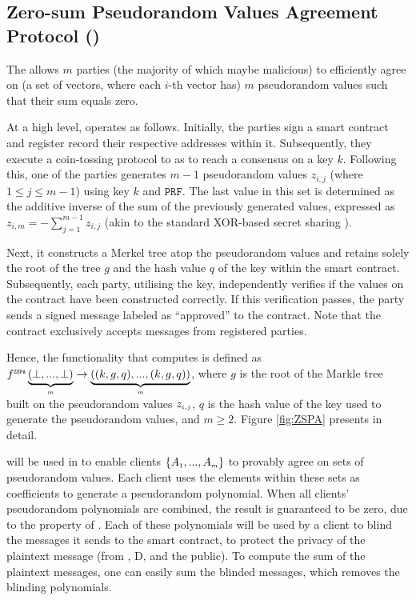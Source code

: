 

\vspace{-3.3mm}
\subsection{Zero-sum Pseudorandom Values Agreement Protocol (\zspa)}
\vspace{-1mm}

The \zspa  allows $m$ parties (the majority of which maybe malicious) to efficiently agree on (a set of vectors, where each $i$-th vector has) $m$ pseudorandom values such that their sum equals zero. 

At a high level, \zspa operates as follows. Initially, the parties sign a smart contract and register record their respective  addresses within it. Subsequently, they execute a  coin-tossing protocol to as \ct to reach a consensus on a key $k$.  Following this, one of the parties generates $m-1$ pseudorandom values $z_{\scriptscriptstyle i, j}$ (where $1\leq j\leq m-1$) using key $k$ and $\mathtt{PRF}$. The last value in this set is determined as the additive inverse of the sum of the previously generated values, expressed as
 $z_{\scriptscriptstyle i, m}=-\sum\limits^{\scriptscriptstyle m-1}_{\scriptscriptstyle j=1}z_{\scriptscriptstyle i, j}$ (akin to the standard XOR-based secret sharing \cite{Schneier0078909}). 
%

Next, it constructs a Merkel tree  atop the pseudorandom values and retains solely the root of the tree $g$ and the hash value $q$ of the key within the smart contract. Subsequently, each party, utilising the key, independently verifies if the values on the contract have been constructed correctly. If this verification passes, the party sends a signed message labeled as ``approved'' to the contract. Note that the contract exclusively accepts messages from registered parties. 

Hence, the functionality that \zspa computes is defined as $f^{\scriptscriptstyle \mathtt{ZSPA}}\underbrace{(\bot,..., \bot)}_{\scriptscriptstyle m}\rightarrow \underbrace{((k, g, q),..., (k, g,q))}_{\scriptscriptstyle m}$, where $g$ is the root of the Markle tree built on the pseudorandom values $z_{\scriptscriptstyle i, j}$, $q$ is the hash value of the key used to generate the pseudorandom values, and $m\geq 2$. Figure \ref{fig:ZSPA} presents \zspa in detail.  



\zspa will be used in \withFai to enable clients $\{A_{\scriptscriptstyle 1},...,A_{\scriptscriptstyle m}\}$ to provably agree on sets of pseudorandom values. Each client uses the elements within these sets as coefficients to generate a pseudorandom polynomial. When all clients' pseudorandom polynomials are combined, the result is guaranteed to be zero, due to the property of \zspa.  Each of these polynomials will be used by a client to blind the messages it sends to the smart contract, to protect the privacy of the plaintext message (from \aud, D, and the public). To compute the sum of the plaintext messages, one can easily sum the blinded messages, which removes the blinding polynomials. 



